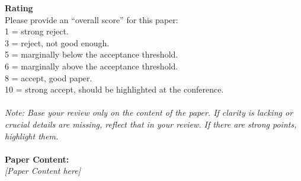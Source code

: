 \begin{figure*}[h]
\begin{prompt}[title={Prompt \thetcbcounter: LLM-as-Reviewer Prompt}]
\textbf{Rating}\\
Please provide an ``overall score'' for this paper:\\
1 = strong reject.\\
3 = reject, not good enough.\\
5 = marginally below the acceptance threshold.\\
6 = marginally above the acceptance threshold.\\
8 = accept, good paper.\\
10 = strong accept, should be highlighted at the conference.\\ \\ 

\textit{Note: Base your review only on the content of the paper. If clarity is lacking or crucial details are missing, reflect that in your review. If there are strong points, highlight them.}\\ \\


\textbf{Paper Content:} \\
\textit{[Paper Content here]}
\end{prompt}
\label{prompt:review}
\end{figure*}


